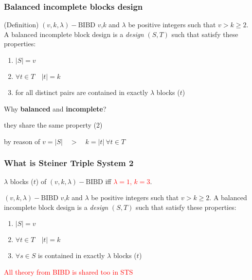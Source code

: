 	\begin{frame}
		\frametitle{Balanced incomplete blocks design}
		\begin{block}{(Definition) $(v,k,\lambda)-\mathrm{BIBD}$}
			$v$,$k$ and $\lambda$ be positive integers such that $v > k \ge 2$. A balanced incomplete block design is a \textit{design} $(S,T)$ such that satisfy these properties:
			\begin{enumerate}
				\item $|S|=v$
				\item $\forall t \in T\quad |t|= k $
				\item for all distinct pairs are contained in exactly $\lambda$ blocks ($t$) 
			\end{enumerate}
		\end{block}
	

		Why \textbf{balanced} and \textbf{incomplete}?\\
		\begin{description}[l]
			\item[balanced] they share the same property (2)
			\item[incomplete] by reason of $v=|S|\quad > \quad k=|t| \  \forall t \in T$
		\end{description}

	\end{frame}

	\begin{frame}
	\frametitle{What is Steiner Triple System 2}
	
	$\lambda$ blocks ($t$) of $(v,k,\lambda)-\mathrm{BIBD}$ iff \textcolor{red}{$\lambda = 1$, $k=3$}.
	
	\begin{block}{$(v,k,\lambda)-\mathrm{BIBD}$}
		$v$,$k$ and $\lambda$ be positive integers such that $v > k \ge 2$. A balanced incomplete block design is a \textit{design} $(S,T)$ such that satisfy these properties:
		\begin{enumerate}
			\item $|S|=v$
			\item $\forall t \in T\quad |t|= k $
			\item $\forall s \in S$ is contained in exactly $\lambda$ blocks ($t$) 
		\end{enumerate}
	\end{block}
	\pause
	\textcolor{red}{All theory from BIBD is shared too in STS}
	
	\end{frame}


